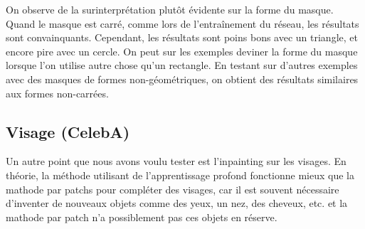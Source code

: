 \documentclass[12pt]{article}
\begin{document}
\begin{figure}[htb]
  \hfill
  \hfill
  \caption{}\label{fig:occlus_dynamic}
\end{figure}

On observe de la surinterprétation plutôt évidente sur la forme du
masque. Quand le masque est carré, comme lors de l'entraînement du
réseau, les résultats sont convainquants. Cependant, les résultats
sont poins bons avec un triangle, et encore pire avec un cercle. On
peut sur les exemples deviner la forme du masque lorsque l'on utilise
autre chose qu'un rectangle. En testant sur d'autres exemples avec des
masques de formes non-géométriques, on obtient des résultats
similaires aux formes non-carrées.

\subsection{Visage (CelebA)}

Un autre point que nous avons voulu tester est l'inpainting sur les visages. En théorie, la méthode utilisant de l'apprentissage profond fonctionne mieux que la mathode par patchs pour compléter des visages, car il est souvent nécessaire d'inventer de nouveaux objets comme des yeux, un nez, des cheveux, etc. et la mathode par patch n'a possiblement pas ces objets en réserve.
\end{document}
